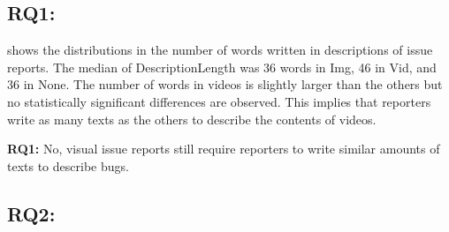 

\subsection*{RQ1: \RQone{}}

 shows the distributions in the number of words 
written in descriptions of issue reports. 
The median of DescriptionLength was 36 words in Img, 
46 in Vid, and 36 in None. 
The number of words in videos is slightly larger than 
the others but no statistically significant differences are observed. 
This implies that reporters write as many texts as the others 
to describe the contents of videos. 

\summarybox
{{\bf RQ1: }{No, visual issue reports still require reporters 
to write similar amounts of texts to describe bugs. 
}}

\subsection*{RQ2: \RQtwo{}}


